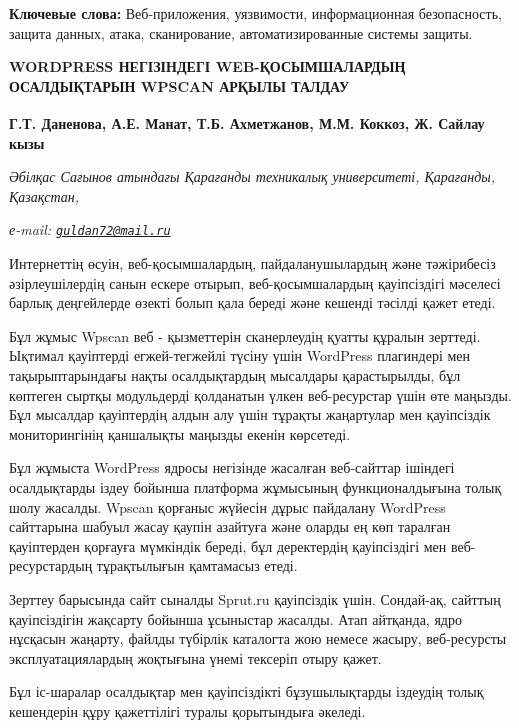 {\bfseries Ключевые слова:} Веб-приложения, уязвимости, информационная безопасность,
защита данных, атака, сканирование, автоматизированные системы защиты.

\begin{articleheader}
{\bfseries WORDPRESS НЕГІЗІНДЕГІ WEB-ҚОСЫМШАЛАРДЫҢ ОСАЛДЫҚТАРЫН WPSCAN АРҚЫЛЫ ТАЛДАУ}

{\bfseries
Г.Т. Даненова\textsuperscript{\envelope },
А.Е. Манат,
Т.Б. Ахметжанов,
М.М. Коккоз,
Ж. Сайлау кызы}
\end{articleheader}

\begin{affiliation}
\emph{Әбілқас Сағынов атындағы Қарағанды техникалық университеті, Қарағанды, Қазақстан,}

\emph{е-mail: \href{mailto:guldan72@mail.ru}{\nolinkurl{guldan72@mail.ru}}}
\end{affiliation}

Интернеттің өсуін, веб-қосымшалардың, пайдаланушылардың және тәжірибесіз
әзірлеушілердің санын ескере отырып, веб-қосымшалардың қауіпсіздігі
мәселесі барлық деңгейлерде өзекті болып қала береді және кешенді
тәсілді қажет етеді.

Бұл жұмыс Wpscan веб - қызметтерін сканерлеудің қуатты құралын зерттеді.
Ықтимал қауіптерді егжей-тегжейлі түсіну үшін WordPress плагиндері мен
тақырыптарындағы нақты осалдықтардың мысалдары қарастырылды, бұл
көптеген сыртқы модульдерді қолданатын үлкен веб-ресурстар үшін өте
маңызды. Бұл мысалдар қауіптердің алдын алу үшін тұрақты жаңартулар мен
қауіпсіздік мониторингінің қаншалықты маңызды екенін көрсетеді.

Бұл жұмыста WordPress ядросы негізінде жасалған веб-сайттар ішіндегі
осалдықтарды іздеу бойынша платформа жұмысының функционалдығына толық
шолу жасалды. Wpscan қорғаныс жүйесін дұрыс пайдалану WordPress
сайттарына шабуыл жасау қаупін азайтуға және оларды ең көп таралған
қауіптерден қорғауға мүмкіндік береді, бұл деректердің қауіпсіздігі мен
веб-ресурстардың тұрақтылығын қамтамасыз етеді.

Зерттеу барысында сайт сыналды Sprut.ru қауіпсіздік үшін. Сондай-ақ,
сайттың қауіпсіздігін жақсарту бойынша ұсыныстар жасалды. Атап айтқанда,
ядро нұсқасын жаңарту, файлды түбірлік каталогта жою немесе жасыру,
веб-ресурсты эксплуатациялардың жоқтығына үнемі тексеріп отыру қажет.

Бұл іс-шаралар осалдықтар мен қауіпсіздікті бұзушылықтарды іздеудің
толық кешендерін құру қажеттілігі туралы қорытындыға әкеледі.

